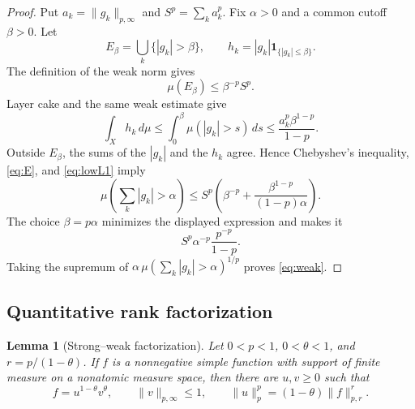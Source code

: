 \documentclass[11pt]{article}
\newtheorem{lemma}[theorem]{Lemma}
\newcommand{\1}{\mathbf 1}
\newcommand{\dd}{\,d}
\begin{document}
\begin{proof}
Put $a_k=\|g_k\|_{p,\infty}$ and
$S^p=\sum_k a_k^p$.  Fix $\alpha>0$ and a common cutoff $\beta>0$.
Let
\[
 E_\beta=\bigcup_k\{|g_k|>\beta\},
 \qquad h_k=|g_k|\1_{\{|g_k|\le\beta\}}.
\]
The definition of the weak norm gives
\begin{equation}\label{eq:E}
 \mu(E_\beta)\le \beta^{-p}S^p.
\end{equation}
Layer cake and the same weak estimate give
\begin{equation}\label{eq:lowL1}
 \int_X h_k\dd\mu
 \le\int_0^\beta\mu(|g_k|>s)\dd s
 \le \frac{a_k^p\beta^{1-p}}{1-p}.
\end{equation}
Outside $E_\beta$, the sums of the $|g_k|$ and the $h_k$ agree.  Hence
Chebyshev's inequality, \eqref{eq:E}, and \eqref{eq:lowL1} imply
\[
 \mu\left(\sum_k|g_k|>\alpha\right)
 \le S^p\left(\beta^{-p}
       +\frac{\beta^{1-p}}{(1-p)\alpha}\right).
\]
The choice $\beta=p\alpha$ minimizes the displayed expression and makes it
\[
 S^p\alpha^{-p}\frac{p^{-p}}{1-p}.
\]
Taking the supremum of
$\alpha\,\mu(\sum_k|g_k|>\alpha)^{1/p}$ proves \eqref{eq:weak}.
\end{proof}

\subsection{Quantitative rank factorization}

\begin{lemma}[Strong--weak factorization]\label{lem:factor}
Let $0<p<1$, $0<\theta<1$, and $r=p/(1-\theta)$.  If $f$ is a
nonnegative simple function with support of finite measure on a nonatomic
measure space, then there are $u,v\ge0$ such that
\begin{equation}\label{eq:factor}
 f=u^{1-\theta}v^\theta,\qquad
 \|v\|_{p,\infty}\le1,\qquad
 \|u\|_p^p=(1-\theta)\|f\|_{p,r}^r.
\end{equation}
\end{lemma}
\end{document}
